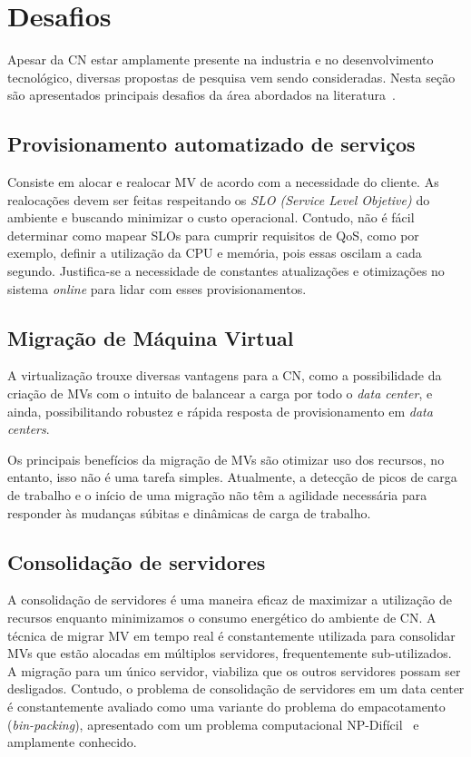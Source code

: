 \documentclass[tcc,capa]{texufpel}
\begin{document}
\section{Desafios}\label{subsec:desafios}
Apesar da CN estar amplamente presente na industria e no desenvolvimento tecnológico, diversas propostas de pesquisa vem sendo consideradas. Nesta seção são apresentados principais desafios da área abordados na literatura~\cite{zhang2010cloud}.

\subsection{Provisionamento automatizado de serviços}
Consiste em alocar e realocar MV de acordo com a necessidade do cliente. As realocações devem ser feitas respeitando os \emph{SLO (Service Level Objetive)} do ambiente e buscando minimizar o custo operacional. Contudo, não é fácil determinar como mapear SLOs para cumprir requisitos de QoS, como por exemplo, definir a utilização da CPU e memória, pois essas oscilam a cada segundo. Justifica-se a necessidade de constantes atualizações e otimizações no sistema \emph{online} para lidar com esses provisionamentos.

\subsection{Migração de Máquina Virtual}

A virtualização trouxe diversas vantagens para a CN, como a possibilidade da criação de MVs com o intuito de balancear a carga por todo o \textit{data center}, e ainda, possibilitando robustez e rápida resposta de provisionamento em \textit{data centers}.

Os principais benefícios da migração de MVs são otimizar uso dos recursos, no entanto, isso não é uma tarefa simples. Atualmente, a detecção de picos de carga de trabalho e o início de uma migração não têm a agilidade necessária para responder às mudanças súbitas e dinâmicas de carga de trabalho.

\subsection{Consolidação de servidores}

A consolidação de servidores é uma maneira eficaz de maximizar a utilização de recursos enquanto minimizamos o consumo energético do ambiente de CN. A técnica de migrar MV em tempo real é constantemente utilizada para consolidar MVs que estão alocadas em múltiplos servidores, frequentemente sub-utilizados. A migração para um único servidor, viabiliza que os outros servidores possam ser desligados. Contudo, o problema de consolidação de servidores em um data center é constantemente avaliado como uma variante do problema do empacotamento (\emph{bin-packing}), apresentado com um problema computacional NP-Difícil~\cite{ferdaus2014virtual} e amplamente conhecido.
\end{document}
